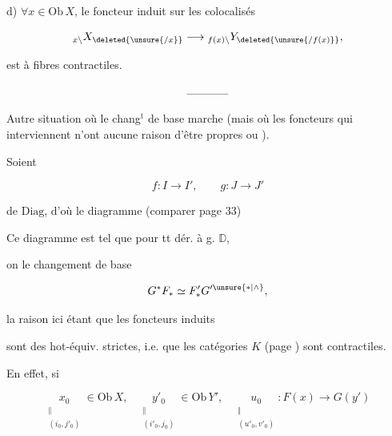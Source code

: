 d) $\forall x\in\mathrm{Ob}\,X$,  le foncteur induit sur les colocalisés

\[
{}_{x\backslash}X_{\deleted{\unsure{/x}}}\longrightarrow{}_{f(x)\backslash}Y_{\deleted{\unsure{/f(x)}}},
\]

est à fibres contractiles.

\[ \rule{1.3cm}{0.4pt} \]

Autre situation  où le chang$^{\mathrm t}$ de base marche (mais où les foncteurs qui interviennent n'ont aucune raison d'être propres ou ).

Soient

\[ f:I\longrightarrow I',\qquad g:J\longrightarrow J' \]

de $\mathrm{Diag}$, d'où le diagramme (comparer page 33)


Ce diagramme  est tel que pour tt dér. à g. $\mathbb D$,

on  le changement de base

\[ G^*F_*\simeq F'_*G'^{\unsure{*|\wedge}}, \]

la raison ici étant que les foncteurs induits


sont des hot-équiv.  strictes, i.e. que les catégories $K$ (page ) sont contractiles.

En effet, si

\[
\underset{\substack{\Vert\\(i_0,j'_0)}}{x_0}\in\mathrm{Ob}\,X,\quad
\underset{\substack{\Vert\\(i'_0,j_0)}}{y'_0}\in\mathrm{Ob}\,Y',\quad
\underset{\substack{\Vert\\(u'_0,v'_0)}}{u_0}:F(x)\longrightarrow G(y')
\]

